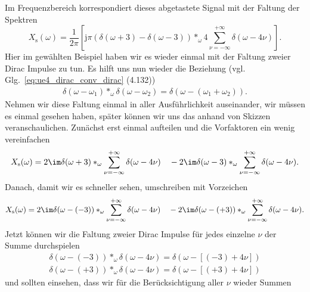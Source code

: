 \begin{ExCalc}
Im Frequenzbereich korrespondiert dieses abgetastete Signal mit der Faltung der Spektren
\begin{equation}
X_\mathrm{s}(\omega) = \frac{1}{2\pi}
\left[
\mathrm{j} \pi \left( \delta(\omega+3) - \delta(\omega-3) \right)
\ast_\omega 4 \sum_{\nu=-\infty}^{+\infty} \delta(\omega-4 \nu)
\right].
\end{equation}
%
Hier im gewählten Beispiel haben wir es wieder einmal mit der Faltung zweier
Dirac Impulse zu tun. Es hilft uns nun wieder die Beziehung (vgl. Glg.~\eqref{eq:ue4_dirac_conv_dirac} (4.132))
\begin{align}
\delta(\omega-\omega_1) \ast_\omega \delta(\omega-\omega_2)=
\delta(\omega-(\omega_1+\omega_2)).
\end{align}
Nehmen wir diese Faltung einmal in aller Ausführlichkeit auseinander, wir müssen es einmal
gesehen haben, später können wir uns das anhand von Skizzen veranschaulichen.
Zunächst erst einmal aufteilen und die Vorfaktoren ein wenig vereinfachen
%
%
\begin{equation}
X_\mathrm{s}(\omega) = 2\im
\delta(\omega+3)
\ast_\omega \sum_{\nu=-\infty}^{+\infty} \delta(\omega-4 \nu)
\quad-
2\im
\delta(\omega-3)
\ast_\omega \sum_{\nu=-\infty}^{+\infty} \delta(\omega-4 \nu).
\end{equation}
Danach, damit wir es schneller sehen, umschreiben mit Vorzeichen
\begin{equation}
X_\mathrm{s}(\omega) = 2\im
\delta(\omega-(-3))
\ast_\omega \sum_{\nu=-\infty}^{+\infty} \delta(\omega-4 \nu)
\quad-
2\im
\delta(\omega-(+3))
\ast_\omega \sum_{\nu=-\infty}^{+\infty} \delta(\omega-4 \nu).
\end{equation}
Jetzt können wir die Faltung zweier Dirac Impulse für jedes einzelne $\nu$
der Summe durchspielen
\begin{align}
\delta(\omega-(-3)) \ast_\omega \delta(\omega-4 \nu) = \delta(\omega - [(-3)+4\nu])\\
\delta(\omega-(+3)) \ast_\omega \delta(\omega-4 \nu) = \delta(\omega - [(+3)+4\nu])
\end{align}
und sollten einsehen, dass wir für die Berücksichtigung aller $\nu$
wieder Summen

\end{ExCalc}
